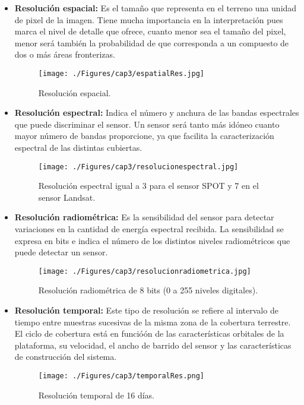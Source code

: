 \begin{itemize}
		\item \textbf{Resolución espacial:} Es el tamaño que representa en el terreno una unidad de pixel de la imagen. Tiene mucha importancia en la interpretaci\'on pues marca el nivel de detalle que ofrece, cuanto menor sea el tama\~{n}o del pixel, menor ser\'a tambi\'en la probabilidad de que corresponda a un compuesto de dos o m\'as \'areas fronterizas.
		\begin{figure}[H]
			\centering
			\texttt{[image: ./Figures/cap3/espatialRes.jpg]}
			\caption{Resoluci\'on espacial.}
			\label{fig:espatialRes}
		\end{figure}
			\item \textbf{Resoluci\'on espectral:} Indica el n\'umero y anchura de las bandas espectrales que puede discriminar el sensor. Un sensor ser\'a tanto m\'as id\'oneo cuanto mayor n\'umero de bandas proporcione, ya que facilita la caracterizaci\'on espectral de las distintas cubiertas.
				\begin{figure}[H]
					\centering
					\texttt{[image: ./Figures/cap3/resolucionespectral.jpg]}
					\caption{Resoluci\'on espectral igual a 3 para el sensor SPOT y 7 en el sensor Landsat.}
					\label{fig:espectralRes}
				\end{figure}
		\item \textbf{Resoluci\'on radiom\'etrica:} Es la sensibilidad del sensor para detectar variaciones en la cantidad de energ\'ia espectral recibida. La sensibilidad se expresa en bits e indica el n\'umero de los distintos niveles radiom\'etricos que puede detectar un sensor.
						\begin{figure}[H]
							\centering
							\texttt{[image: ./Figures/cap3/resolucionradiometrica.jpg]}
							\caption{Resoluci\'on radiom\'etrica de 8 bits (0 a 255 niveles digitales).}
							\label{fig:radioRes}
						\end{figure}
		\item \textbf{Resoluci\'on temporal:} Este tipo de resoluci\'on se refiere al intervalo de tiempo entre muestras sucesivas de la misma zona de la cobertura terrestre. El ciclo de cobertura est\'a en funció\'on de las caracter\'isticas orbitales de la plataforma, su velocidad, el ancho de barrido del sensor y las caracter\'isticas de construcci\'on del sistema.
			\begin{figure}[H]
					\centering
					\texttt{[image: ./Figures/cap3/temporalRes.png]}
					\caption{Resoluci\'on temporal de 16 d\'ias.}
					\label{fig:temporaRes}
				\end{figure}
		

		
	\end{itemize}


